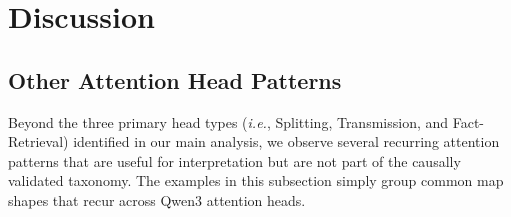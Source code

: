 \documentclass[11pt]{article}
\begin{document}

\section{Discussion}
\label{sec:appendix_discussion}


\iffalse
\subsection{Other Attention Head Patterns}
\label{sec:appendix_other_heads}

Beyond the three primary head types (\textit{i.e.}, Splitting, Transmission, and Fact-Retrieval) identified in our main analysis, we observe several recurring attention patterns that are useful for interpretation but are not part of the causally validated taxonomy. The examples in this subsection simply group common map shapes that recur across Qwen3 attention heads.
\end{document}
